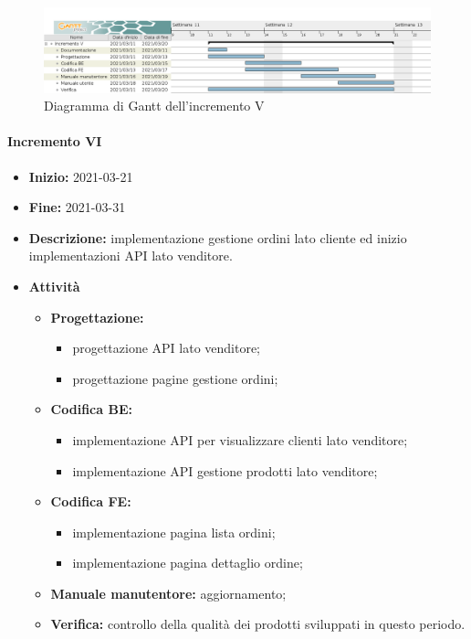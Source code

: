\begin{figure}[H]
    \centering
    \includegraphics[width=1\linewidth]{res/images/pianificazione/incremento_5.png}
    \caption{Diagramma di Gantt dell'incremento V}
    \label{fig:_Gantt incremento V}
\end{figure}

\paragraph[Incremento VI]{Incremento VI}
\begin{itemize}
    \item [] \textbf{Inizio:} 2021-03-21
    \item [] \textbf{Fine:} 2021-03-31
    \item [] \textbf{Descrizione:} implementazione gestione ordini lato cliente ed inizio implementazioni API lato venditore.
    \item [] \textbf{Attività}
          \begin{itemize}
              \item \textbf{Progettazione:}
                    \begin{itemize}
                        \item progettazione API lato venditore;
                        \item progettazione pagine gestione ordini;
                    \end{itemize}
              \item \textbf{Codifica BE:}
                    \begin{itemize}
                        \item implementazione API per visualizzare clienti lato venditore;
                        \item implementazione API gestione prodotti lato venditore;
                    \end{itemize}
              \item \textbf{Codifica FE:}
                    \begin{itemize}
                        \item implementazione pagina lista ordini;
                        \item implementazione pagina dettaglio ordine;
                    \end{itemize}
              \item \textbf{Manuale manutentore:} aggiornamento;
              \item \textbf{Verifica:} controllo della qualità dei prodotti sviluppati in questo periodo.
          \end{itemize}
\end{itemize}

